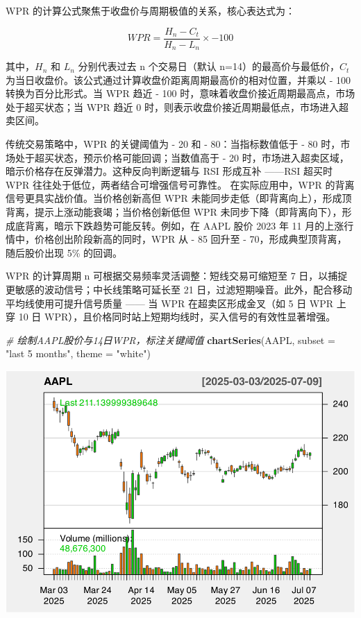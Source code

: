 \documentclass[]{ctexbook}
\newenvironment{Shaded}{\begin{snugshade}}{\end{snugshade}}
\newcommand{\AttributeTok}[1]{\textcolor[rgb]{0.13,0.29,0.53}{#1}}
\newcommand{\CommentTok}[1]{\textcolor[rgb]{0.56,0.35,0.01}{\textit{#1}}}
\newcommand{\FunctionTok}[1]{\textcolor[rgb]{0.13,0.29,0.53}{\textbf{#1}}}
\newcommand{\NormalTok}[1]{#1}
\newcommand{\StringTok}[1]{\textcolor[rgb]{0.31,0.60,0.02}{#1}}
\begin{document}
WPR 的计算公式聚焦于收盘价与周期极值的关系，核心表达式为：

\[WPR = \frac{H_n - C_t}{H_n - L_n} \times -100\]

其中，\(H_n\) 和 \(L_n\) 分别代表过去 n 个交易日（默认 n=14）的最高价与最低价，\(C_t\) 为当日收盘价。该公式通过计算收盘价距离周期最高价的相对位置，并乘以 - 100 转换为百分比形式。当 WPR 趋近 - 100 时，意味着收盘价接近周期最高点，市场处于超买状态；当 WPR 趋近 0 时，则表示收盘价接近周期最低点，市场进入超卖区间。

传统交易策略中，WPR 的关键阈值为 - 20 和 - 80：当指标数值低于 - 80 时，市场处于超买状态，预示价格可能回调；当数值高于 - 20 时，市场进入超卖区域，暗示价格存在反弹潜力。这种反向判断逻辑与 RSI 形成互补 ------RSI 超买时 WPR 往往处于低位，两者结合可增强信号可靠性。
在实际应用中，WPR 的背离信号更具实战价值。当价格创新高但 WPR 未能同步走低（即背离向上），形成顶背离，提示上涨动能衰竭；当价格创新低但 WPR 未同步下降（即背离向下），形成底背离，暗示下跌趋势可能反转。例如，在 AAPL 股价 2023 年 11 月的上涨行情中，价格创出阶段新高的同时，WPR 从 - 85 回升至 - 70，形成典型顶背离，随后股价出现 5\% 的回调。

WPR 的计算周期 n 可根据交易频率灵活调整：短线交易可缩短至 7 日，以捕捉更敏感的波动信号；中长线策略可延长至 21 日，过滤短期噪音。此外，配合移动平均线使用可提升信号质量 ------ 当 WPR 在超卖区形成金叉（如 5 日 WPR 上穿 10 日 WPR），且价格同时站上短期均线时，买入信号的有效性显著增强。

\begin{Shaded}
\begin{Highlighting}[]
\CommentTok{\# 绘制AAPL股价与14日WPR，标注关键阈值}
\FunctionTok{chartSeries}\NormalTok{(AAPL, }\AttributeTok{subset =} \StringTok{"last 5 months"}\NormalTok{, }\AttributeTok{theme =} \StringTok{"white"}\NormalTok{)}
\end{Highlighting}
\end{Shaded}

\includegraphics[width=0.9\linewidth]{quantmod_files/figure-latex/wpr-1}
\end{document}
